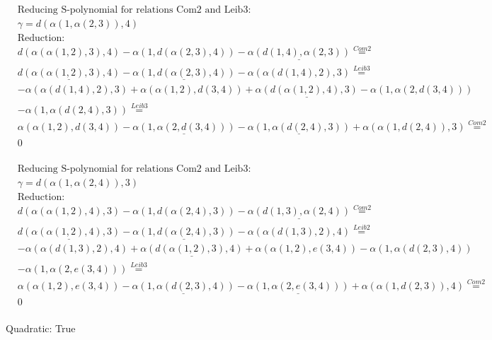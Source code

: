 \documentclass[11pt]{amsart}
\begin{document}
\begin{align*} 
& \text{Reducing S-polynomial for relations Com2 and Leib3:} \\ 
& \gamma = d(\alpha(1,\alpha(2,3)),4) \\ 
& \text{Reduction}: \\&d(\alpha(\alpha(1,2),3),4) - \alpha(1,d(\alpha(2,3),4)) - \underline{\alpha(d(1,4),\alpha(2,3))} \stackrel{ Com2 }{=}  \\ 
&\underline{d(\alpha(\alpha(1,2),3),4)} - \underline{\alpha(1,d(\alpha(2,3),4))} - \alpha(\alpha(d(1,4),2),3) \stackrel{ Leib3 }{=}  \\ 
& - \alpha(\alpha(d(1,4),2),3) + \alpha(\alpha(1,2),d(3,4)) + \underline{\alpha(d(\alpha(1,2),4),3)} - \alpha(1,\alpha(2,d(3,4)))\\ 
 &  - \alpha(1,\alpha(d(2,4),3)) \stackrel{ Leib3 }{=}  \\ 
&\alpha(\alpha(1,2),d(3,4)) - \underline{\alpha(1,\alpha(2,d(3,4)))} - \underline{\alpha(1,\alpha(d(2,4),3))} + \alpha(\alpha(1,d(2,4)),3) \stackrel{ Com2 }{=}  \\ 
&0\\ 
\end{align*} 
 
\begin{align*} 
& \text{Reducing S-polynomial for relations Com2 and Leib3:} \\ 
& \gamma = d(\alpha(1,\alpha(2,4)),3) \\ 
& \text{Reduction}: \\&d(\alpha(\alpha(1,2),4),3) - \alpha(1,d(\alpha(2,4),3)) - \underline{\alpha(d(1,3),\alpha(2,4))} \stackrel{ Com2 }{=}  \\ 
&\underline{d(\alpha(\alpha(1,2),4),3)} - \underline{\alpha(1,d(\alpha(2,4),3))} - \alpha(\alpha(d(1,3),2),4) \stackrel{ Leib2 }{=}  \\ 
& - \alpha(\alpha(d(1,3),2),4) + \underline{\alpha(d(\alpha(1,2),3),4)} + \alpha(\alpha(1,2),e(3,4)) - \alpha(1,\alpha(d(2,3),4))\\ 
 &  - \alpha(1,\alpha(2,e(3,4))) \stackrel{ Leib3 }{=}  \\ 
&\alpha(\alpha(1,2),e(3,4)) - \underline{\alpha(1,\alpha(d(2,3),4))} - \underline{\alpha(1,\alpha(2,e(3,4)))} + \alpha(\alpha(1,d(2,3)),4) \stackrel{ Com2 }{=}  \\ 
&0\\ 
\end{align*} 
 

 Quadratic: True
 
\end{document}
